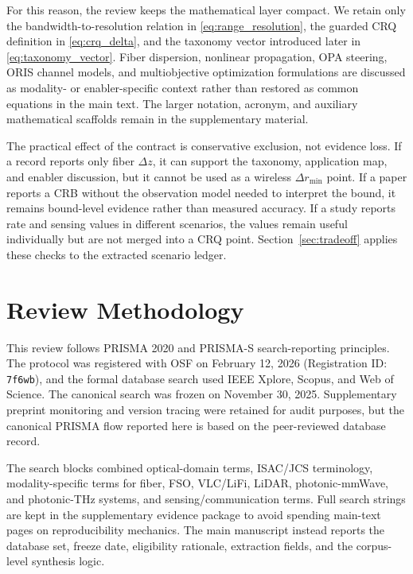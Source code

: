 \documentclass[letterpaper,journal]{IEEEtran}
\begin{document}
For this reason, the review keeps the mathematical layer compact. We retain only the bandwidth-to-resolution relation in \eqref{eq:range_resolution}, the guarded CRQ definition in \eqref{eq:crq_delta}, and the taxonomy vector introduced later in \eqref{eq:taxonomy_vector}. Fiber dispersion, nonlinear propagation, OPA steering, ORIS channel models, and multiobjective optimization formulations are discussed as modality- or enabler-specific context rather than restored as common equations in the main text. The larger notation, acronym, and auxiliary mathematical scaffolds remain in the supplementary material.

The practical effect of the contract is conservative exclusion, not evidence loss. If a record reports only fiber \(\Delta z\), it can support the taxonomy, application map, and enabler discussion, but it cannot be used as a wireless \(\Delta r_{\min}\) point. If a paper reports a CRB without the observation model needed to interpret the bound, it remains bound-level evidence rather than measured accuracy. If a study reports rate and sensing values in different scenarios, the values remain useful individually but are not merged into a CRQ point. Section~\ref{sec:tradeoff} applies these checks to the extracted scenario ledger.

\section{Review Methodology}
\label{sec:methodology}

This review follows PRISMA 2020 and PRISMA-S search-reporting principles. The protocol was registered with OSF on February 12, 2026 (Registration ID: \texttt{7f6wb}), and the formal database search used IEEE Xplore, Scopus, and Web of Science. The canonical search was frozen on November 30, 2025. Supplementary preprint monitoring and version tracing were retained for audit purposes, but the canonical PRISMA flow reported here is based on the peer-reviewed database record.

The search blocks combined optical-domain terms, ISAC/JCS terminology, modality-specific terms for fiber, FSO, VLC/LiFi, LiDAR, photonic-mmWave, and photonic-THz systems, and sensing/communication terms. Full search strings are kept in the supplementary evidence package to avoid spending main-text pages on reproducibility mechanics. The main manuscript instead reports the database set, freeze date, eligibility rationale, extraction fields, and the corpus-level synthesis logic.
\end{document}
